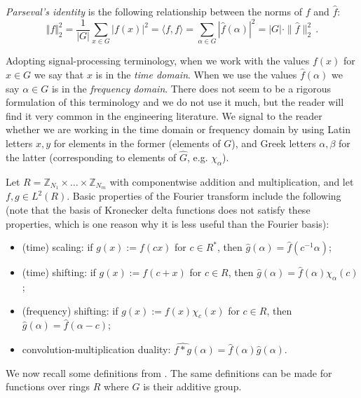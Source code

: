 \documentclass[11pt]{article}
\theoremstyle{definition}
\newcommand{\Z}{\mathbb{Z}}
\begin{document}
\emph{Parseval's identity} is the following relationship between the norms of $f$ and $\widehat{f}$:
\[
    \Vert f \Vert_2^2 =  \frac{1}{|G|} \sum_{x \in G} | f(x)|^2 = \langle f, f \rangle = \sum_{\alpha \in G} | \widehat{f}(\alpha) |^2 = |G| \cdot \|\widehat{f}\|_2^2 \,.
\]

Adopting signal-processing terminology, when we work with the values $f(x)$ for $x\in G$ we say that $x$ is in the \emph{time domain}. When we use the values $\widehat{f}(\alpha)$ we say $\alpha\in G$ is in the \emph{frequency domain}.
There does not seem to be a rigorous formulation of this terminology and we do not use it much, but the reader will find it very common in the engineering literature.
We signal to the reader whether we are working in the time domain or frequency domain by using Latin letters $x,y$ for elements in the former (elements of $G$), and Greek letters $\alpha,\beta$ for the latter (corresponding to elements of $\widehat{G}$, e.g. $\chi_{\alpha}$).


Let $R=\Z_{N_1} \times \ldots \times \Z_{N_m}$ with componentwise addition and multiplication, and let $f,g\in L^2(R)$.
Basic properties of the Fourier transform include the following (note that the basis of Kronecker delta functions does not satisfy these properties, which is one reason why it is less useful than the Fourier basis):

\begin{itemize}
    \item (time) scaling: if $g(x) := f(cx)$ for $c \in R^*$, then $\widehat{g}(\alpha) = \widehat{f}(c^{-1}\alpha)$;
    \item (time) shifting: if $g(x) := f(c+x)$ for $c \in R$, then $\widehat{g}(\alpha) = \widehat{f}(\alpha)\chi_\alpha(c)$;
    \item (frequency) shifting: if $g(x) := f(x)\chi_c(x)$ for $c \in R$, then $\widehat{g}(\alpha) = \widehat{f}(\alpha-c)$;
    \item convolution-multiplication duality: $\widehat{f \ast g}(\alpha) = \widehat{f}(\alpha) \widehat{g}(\alpha)$.
\end{itemize}

We now recall some definitions from \cite{AGS, Duc, MR}. The same definitions can be made for functions over rings $R$ where $G$ is their additive group.
\end{document}
